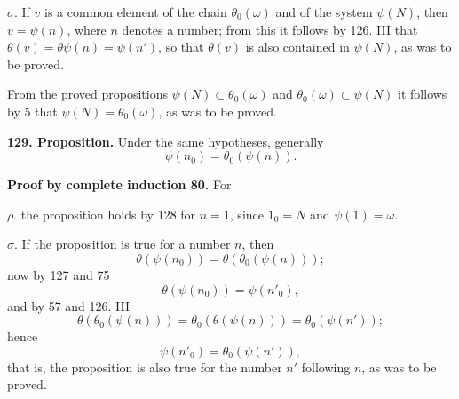 \documentclass[11pt]{article}
\newcommand{\partof}{\mathrel{\subset}}
\begin{document}
\noindent $\sigma.$ If $v$ is a common element of the chain $\theta_0(\omega)$ and of the system $\psi(N)$, then $v=\psi(n)$, where $n$ denotes a number; from this it follows by 126. III that $\theta(v)=\theta\psi(n)=\psi(n')$, so that $\theta(v)$ is also contained in $\psi(N)$, as was to be proved.

From the proved propositions $\psi(N)\partof\theta_0(\omega)$ and $\theta_0(\omega)\partof\psi(N)$ it follows by 5 that $\psi(N)=\theta_0(\omega)$, as was to be proved.

\noindent\textbf{129. Proposition.} Under the same hypotheses, generally
\[
\psi(n_0)=\theta_0(\psi(n)).
\]

\noindent\textbf{Proof by complete induction 80.} For

\noindent $\rho.$ the proposition holds by 128 for $n=1$, since $1_0=N$ and $\psi(1)=\omega$.

\noindent $\sigma.$ If the proposition is true for a number $n$, then
\[
\theta(\psi(n_0))=\theta(\theta_0(\psi(n)));
\]
now by 127 and 75
\[
\theta(\psi(n_0))=\psi(n'_0),
\]
and by 57 and 126. III
\[
\theta(\theta_0(\psi(n)))=\theta_0(\theta(\psi(n)))=\theta_0(\psi(n'));
\]
hence
\[
\psi(n'_0)=\theta_0(\psi(n')),
\]
that is, the proposition is also true for the number $n'$ following $n$, as was to be proved.
\end{document}

